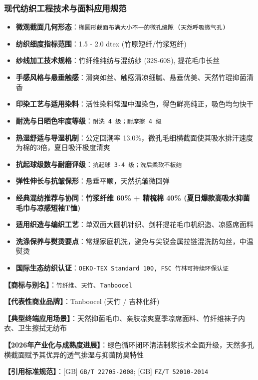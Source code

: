 \documentclass[11pt,openright,twoside,UTF8]{ctexbook}
\begin{document}
\subsubsection*{现代纺织工程技术与面料应用规范}
\begin{itemize} \setlength{\itemsep}{2pt}
    \item \textbf{微观截面几何形态}：\texttt{椭圆形截面布满大小不一的微孔缝隙 (天然呼吸微气孔)}
    \item \textbf{纺织细度指标范围}：1.5 - 2.0 dtex (竹原短纤/竹浆短纤)
    \item \textbf{纱线加工技术规格}：竹纤维纯纺与混纺纱 (32S-60S), 提花毛巾长丝
    \item \textbf{手感风格与悬垂触感}：滑爽如丝、触感清凉细腻、悬垂优美、天然竹琨抑菌清香
    \item \textbf{印染工艺与适用染料}：活性染料常温中温染色，得色鲜亮纯正，吸色均匀快干
    \item \textbf{耐洗与日晒色牢度等级}：\texttt{耐洗 4 级；耐摩擦 4 级}
    \item \textbf{热湿舒适与导湿机制}：公定回潮率 13.0\%，微孔毛细横截面使其吸水排汗速度为棉的3倍，夏日吸汗极度清爽
    \item \textbf{抗起球级数与耐磨评级}：\texttt{抗起球 3-4 级；洗后柔软不板结}
    \item \textbf{弹性伸长与抗皱保形}：悬垂平顺，天然抗皱微回弹
    \item \textbf{经典混纺推荐与协同}：\textbf{竹浆纤维 60\% + 精梳棉 40\% (夏日爆款高吸水抑菌毛巾与凉感短袖T恤)}
    \item \textbf{适用织造与编织工艺}：单双面大圆机针织、剑杆提花毛巾机织造、凉感席面料
    \item \textbf{洗涤保养与熨烫要点}：常规家庭机洗，避免与尖锐金属拉链混洗防勾丝，中温熨烫
    \item \textbf{国际生态纺织认证}：\texttt{OEKO-TEX Standard 100, FSC 竹林可持续环保认证}
\end{itemize}
\vspace{0.2cm}

\noindent\textbf{【商标与别名】}：\texttt{竹纤维}、\texttt{天竹}、\texttt{Tanboocel}\par
\noindent\textbf{【代表性商业品牌】}：Tanboocel (天竹 / 吉林化纤)\par
\noindent\textbf{【典型终端应用场景】}：天然抑菌毛巾、亲肤凉爽夏季凉席面料、竹纤维袜子内衣、卫生擦拭无纺布\par
\noindent\textbf{【2026年产业化与成熟度进展】}：绿色循环闭环清洁制浆技术全面升级，天然多孔横截面赋予其优异的透气排湿与抑菌防臭特性\par
\noindent\textbf{【引用标准规范】}：[GB] \texttt{GB/T 22705-2008}; [GB] \texttt{FZ/T 52010-2014}\par
\vspace{0.5cm}
\end{document}
